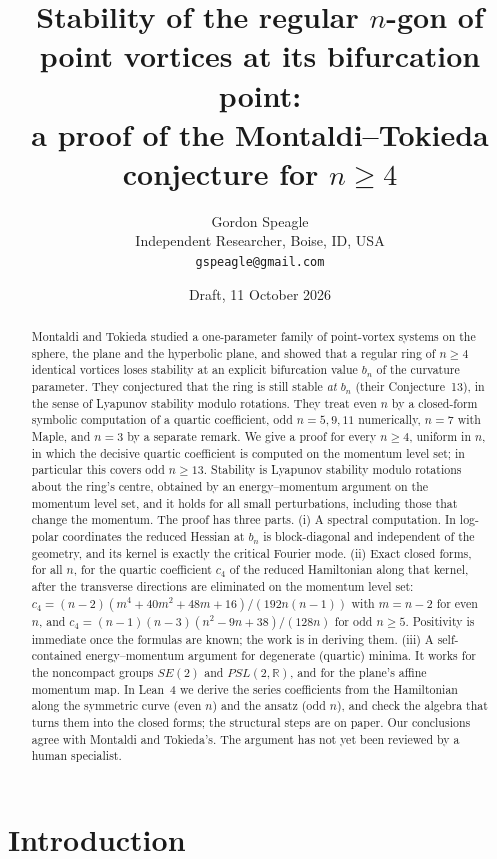 \documentclass[11pt]{article}
\title{Stability of the regular $n$-gon of point vortices at its bifurcation point:\\
a proof of the Montaldi--Tokieda conjecture for $n\ge4$}
\author{Gordon Speagle\\
Independent Researcher, Boise, ID, USA\\
\texttt{gspeagle@gmail.com}}
\date{Draft, 11 October 2026}
\theoremstyle{definition}
\theoremstyle{remark}
\newcommand{\R}{\mathbb{R}}
\begin{document}
\maketitle

\begin{abstract}
Montaldi and Tokieda studied a one-parameter family of point-vortex systems on the sphere, the plane and
the hyperbolic plane, and showed that a regular ring of $n\ge4$ identical vortices loses stability at an
explicit bifurcation value $b_n$ of the curvature parameter. They conjectured that the ring is still
stable \emph{at} $b_n$ (their Conjecture~13), in the sense of Lyapunov stability modulo rotations. They
treat even $n$ by a closed-form symbolic computation of a quartic coefficient, odd $n=5,9,11$ numerically,
$n=7$ with Maple, and $n=3$ by a separate remark. We give a proof for every $n\ge4$, uniform in $n$, in
which the decisive quartic coefficient is computed on the momentum level set; in particular this covers
odd $n\ge13$. Stability is Lyapunov stability modulo rotations about the ring's centre, obtained by
an energy--momentum argument on the momentum level set, and it holds for all small perturbations,
including those that change the momentum. The proof has three parts.
(i) A spectral computation. In log-polar coordinates the reduced Hessian at $b_n$ is block-diagonal and
independent of the geometry, and its kernel is exactly the critical Fourier mode.
(ii) Exact closed forms, for all $n$, for the quartic coefficient $c_4$ of the reduced Hamiltonian along
that kernel, after the transverse directions are eliminated on the momentum level set:
$c_4=(n-2)(m^4+40m^2+48m+16)/(192n(n-1))$ with $m=n-2$ for even $n$, and
$c_4=(n-1)(n-3)(n^2-9n+38)/(128n)$ for odd $n\ge5$. Positivity is immediate once the formulas are known;
the work is in deriving them.
(iii) A self-contained energy--momentum argument for degenerate (quartic) minima. It works for the
noncompact groups $SE(2)$ and $PSL(2,\R)$, and for the plane's affine momentum map.
In Lean~4 we derive the series coefficients from the Hamiltonian along the symmetric curve (even $n$) and the
ansatz (odd $n$), and check the algebra that turns them into the closed forms; the structural steps are on
paper. Our conclusions agree with Montaldi and Tokieda's. The argument has not yet been reviewed by a human
specialist.
\end{abstract}

\tableofcontents

\section{Introduction}\label{sec:intro}
\end{document}
